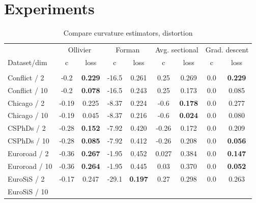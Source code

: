 \documentclass{article} %
\begin{document}
\section{Experiments}\label{sec:experiments}

\begin{table}[t]
\caption{Compare curvature estimators, distortion}
\label{tab:compare_distortion}
\begin{center}
\begin{tabular}{lcccccc|cc}
&
\multicolumn{2}{c}{Ollivier} &
\multicolumn{2}{c}{Forman} &
\multicolumn{2}{c}{Avg. sectional} &
\multicolumn{2}{|c}{Grad. descent} \\
Dataset/dim & c & loss  & c & loss  & c & loss  & c & loss \\%
 \hline \\
Conflict / 2 &
-0.2 &	\textbf{0.229} &
-16.5 &	0.261 &
0.25 & 	0.269 &
0.0 & \textbf{0.229} \\
Conflict / 10 &
-0.2 & \textbf{0.078} &
-16.5 &	0.243 &
0.25 &	0.173 &
0.0 & 0.085  \\
Chicago / 2 &
-0.19 & 0.225 & 
-8.37 & 0.224 & 
-0.6 & \textbf{0.178} & 
0.0 & 0.277 \\
Chicago / 10 &
-0.19 & 0.045 & 
-8.37 & 0.216 & 
-0.6 & \textbf{0.024} & 
0.0 & 0.080  \\
CSPhDs / 2 &
-0.28 &	\textbf{0.152} &
-7.92 &	0.420 &
-0.26 & 0.172 &
0.0 & 0.209 \\
CSPhDs / 10 &
-0.28 &	\textbf{0.085} &
-7.92 &	0.412 &
-0.26 & 0.208 &
0.0 & \textbf{0.056} \\
Euroroad / 2 &
-0.36 &	\textbf{0.267} &
-1.95 &	0.452&
0.027 &	0.384&
0.0 & \textbf{0.147}\\
Euroroad / 10 &
-0.36 &	\textbf{0.264} &
-1.95 &	0.445 &
0.03 &	0.370 &
0.0 & \textbf{0.052}  \\
EuroSiS / 2 &
-0.17 & 0.247 & 
-29.1 & \textbf{0.197} & 
0.27 & 0.298 & 
0.0 & 0.263 \\
EuroSiS / 10 &

\end{tabular}
\end{center}
\end{table}
\end{document}
